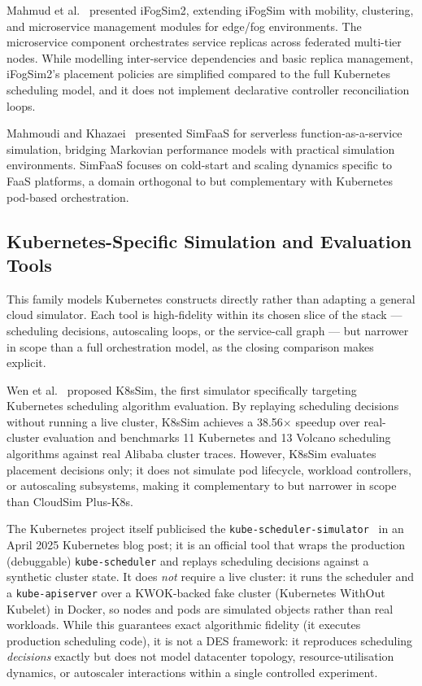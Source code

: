 \documentclass[ASNA,twocolumn]{USG}
\newcommand{\ckm}{CloudSim Plus-K8s\xspace}
\begin{document}
    Mahmud et al.~\cite{Mahmud2021} presented iFogSim2, extending iFogSim
    with mobility, clustering, and microservice management modules for
    edge/fog environments. The microservice component orchestrates service
    replicas across federated multi-tier nodes. While modelling
    inter-service dependencies and basic replica management, iFogSim2's
    placement policies are simplified compared to the full Kubernetes
    scheduling model, and it does not implement declarative controller
    reconciliation loops.

    Mahmoudi and Khazaei~\cite{Mahmoudi2021} presented SimFaaS for
    serverless function-as-a-service simulation, bridging Markovian
    performance models with practical simulation environments. SimFaaS
    focuses on cold-start and scaling dynamics specific to FaaS platforms,
    a domain orthogonal to but complementary with Kubernetes pod-based
    orchestration.

    \subsection{Kubernetes-Specific Simulation and Evaluation Tools}
    \label{sec:related-k8s}

    This family models Kubernetes constructs directly rather than adapting
    a general cloud simulator. Each tool is high-fidelity within its chosen
    slice of the stack --- scheduling decisions, autoscaling loops, or the
    service-call graph --- but narrower in scope than a full orchestration
    model, as the closing comparison makes explicit.

    Wen et al.~\cite{Wen2023} proposed K8sSim, the first simulator
    specifically targeting Kubernetes scheduling algorithm evaluation. By
    replaying scheduling decisions without running a live cluster, K8sSim
    achieves a 38.56$\times$ speedup over real-cluster evaluation and
    benchmarks 11 Kubernetes and 13 Volcano scheduling algorithms against
    real Alibaba cluster traces. However, K8sSim evaluates placement
    decisions only; it does not simulate pod lifecycle, workload
    controllers, or autoscaling subsystems, making it complementary to
    but narrower in scope than \ckm.

    The Kubernetes project itself publicised the
    \texttt{kube-scheduler-simulator}~\cite{KubeSchSim2025} in an April 2025
    Kubernetes blog post; it is an official tool that wraps the production (debuggable)
    \texttt{kube-scheduler} and replays scheduling decisions against a
    synthetic cluster state. It does \emph{not} require a live cluster:
    it runs the scheduler and a \texttt{kube-apiserver} over a
    KWOK-backed fake cluster (Kubernetes WithOut Kubelet) in Docker, so
    nodes and pods are simulated objects rather than real workloads.
    While this guarantees exact algorithmic fidelity (it executes
    production scheduling code), it is not a DES framework: it reproduces
    scheduling \emph{decisions} exactly but does not model datacenter
    topology, resource-utilisation dynamics, or autoscaler interactions
    within a single controlled experiment.
\end{document}
